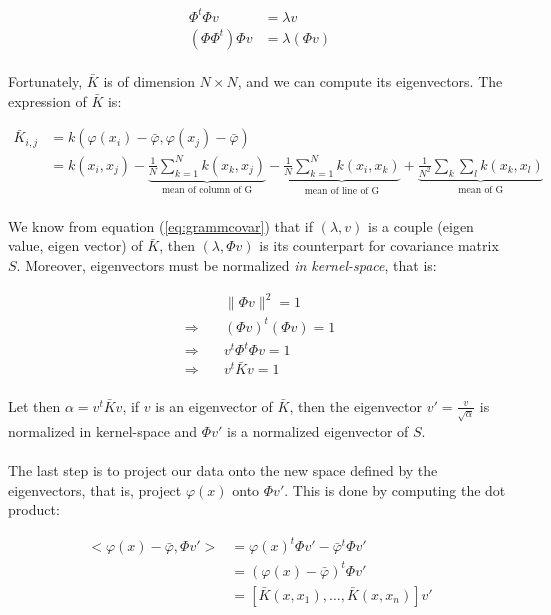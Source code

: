 \begin{align}\label{eq:grammcovar}
\Phi^t\Phi v &= \lambda v \\
(\Phi\Phi^t)\Phi v &= \lambda (\Phi v)
\end{align}

\paragraph{}
Fortunately, $\bar{K}$ is of dimension $N \times N$, and we can compute its eigenvectors. The expression of $\bar{K}$ is:

\begin{align*}
\bar{K}_{i, j} &= k(\varphi(x_i) - \bar{\varphi}, \varphi(x_j) - \bar{\varphi}) \\
&= k(x_i, x_j)
	- \underbrace{\frac{1}{N}\sum_{k = 1}^N k(x_k, x_j)}_{\text{mean of column of G}}
    - \underbrace{\frac{1}{N}\sum_{k = 1}^N k(x_i, x_k)}_{\text{mean of line of G}}
    + \underbrace{\frac{1}{N^2}\sum_k\sum_l k(x_k, x_l)}_{\text{mean of G}}
\end{align*}

\paragraph{}
We know from equation (\ref{eq:grammcovar}) that if $(\lambda, v)$ is a couple (eigen value, eigen vector) of $\bar{K}$, then $(\lambda, \Phi v)$ is its counterpart for covariance matrix $S$. Moreover, eigenvectors must be normalized \emph{in kernel-space}, that is:

\begin{align*}
&\| \Phi v \|^2 = 1 \\
\Rightarrow\quad &(\Phi v)^t(\Phi v) = 1 \\
\Rightarrow\quad &v^t\Phi^t\Phi v = 1 \\
\Rightarrow\quad &v^t \bar{K} v = 1
\end{align*}

\paragraph{}
Let then $\alpha = v^t \bar{K} v$, if $v$ is an eigenvector of $\bar{K}$, then the eigenvector $v' = \frac{v}{\sqrt{\alpha}}$ is normalized in kernel-space and $\Phi v'$ is a normalized eigenvector of $S$.


\paragraph{}
The last step is to project our data onto the new space defined by the eigenvectors, that is, project $\varphi(x)$ onto $\Phi v'$. This is done by computing the dot product:

\begin{align*}
<\varphi(x) - \bar{\varphi}, \Phi v'> &= \varphi(x)^t\Phi v' - \bar{\varphi}^t\Phi v' \\
&= (\varphi(x) - \bar{\varphi})^t\Phi v' \\
&= [\bar{K}(x, x_1), \ldots, \bar{K}(x, x_n)] v'
\end{align*}

